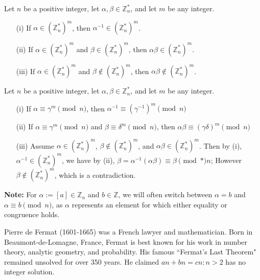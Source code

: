 \begin{theo}

\label{theo:res_class_powers}

Let \(n\) be a positive integer, let \(\alpha, \beta \in \mathbb{Z}_n^*\), and let \(m\) be any integer.

\begin{itemize}
    \item[(i)] If \(\alpha \in (\mathbb{Z}_n^*)^m\), then \(\alpha^{-1} \in (\mathbb{Z}_n^*)^m\).
    \item[(ii)] If \(\alpha \in (\mathbb{Z}_n^*)^m\) and \(\beta \in (\mathbb{Z}_n^*)^m\), then \(\alpha \beta \in (\mathbb{Z}_n^*)^m\).
    \item[(iii)] If \(\alpha \in (\mathbb{Z}_n^*)^m\) and \(\beta \notin (\mathbb{Z}_n^*)^m\), then \(\alpha \beta \notin (\mathbb{Z}_n^*)^m\).
\end{itemize}
\end{theo}

\begin{Proof}

    Let \(n\) be a positive integer, let \(\alpha, \beta \in \mathbb{Z}_n^*\), and let \(m\) be any integer.
    \begin{itemize}
        \item [(i)] If \(\alpha \equiv \gamma^m \pmod{n}\), then \(\alpha^{-1} \equiv (\gamma^{-1})^m \pmod{n}\)
        \item [(ii)] If \(\alpha \equiv \gamma^m \pmod{n}\) and \(\beta \equiv \delta^m \pmod{n}\), then \(\alpha \beta \equiv (\gamma \delta)^m \pmod{n}\)
        \item [(iii)] Assume \(\alpha \in (\mathbb{Z}_n^*)^m\), \(\beta \notin (\mathbb{Z}_n^*)^m\), and \(\alpha \beta \in (\mathbb{Z}_n^*)^m\). Then by (i), \(\alpha^{-1} \in (\mathbb{Z}_n^*)^m\), we have by (ii),
         \(\beta = \alpha^{-1}(\alpha \beta)\equiv \beta \pmod*{n}\); However \(\beta \notin (\mathbb{Z}_n^*)^m\), which is a contradiction.
    \end{itemize}
   
\end{Proof}

\begin{Note}
    \textbf{Note:} For $\alpha := [a] \in \mathbb{Z}_n$ and $b \in \mathbb{Z}$, we will often switch between $\alpha = b$ and $\alpha \equiv b \pmod{n}$, as $\alpha$ represents an element for which either equality or congruence holds.
\end{Note}
\begin{Tip}
Pierre de Fermat (1601-1665) was a French lawyer and mathematician. Born in Beaumont-de-Lomagne, France, Fermat is best known for his work in number theory, analytic geometry, and probability. His famous ``Fermat's Last Theorem" remained unsolved for over 350 years. He claimed $an+bn=cn:n>2$ has no integer solution.
\end{Tip}



